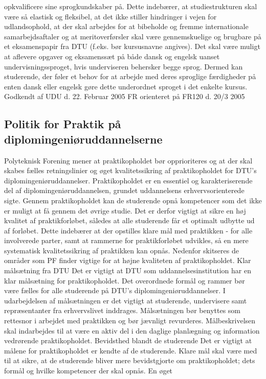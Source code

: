 opkvalificere sine sprogkundskaber på. Dette indebærer, at studiestrukturen skal være så elastisk og fleksibel, at det
ikke stiller hindringer i vejen for udlandsophold, at der skal arbejdes for at bibeholde og fremme internationale
samarbejdsaftaler og at meritoverførsler skal være gennemskuelige og brugbare på et eksamenspapir fra DTU (f.eks.
bør kursusnavne angives).
Det skal være muligt at aflevere opgaver og eksamenssæt på både dansk og engelsk uanset undervisningssproget, hvis
underviseren behersker begge sprog. Dermed kan studerende, der føler et behov for at arbejde med deres sproglige
færdigheder på enten dansk eller engelsk gøre dette underordnet sproget i det enkelte kursus.
Godkendt af UDU d. 22. Februar 2005
FR orienteret på FR120 d. 20/3 2005
\subsection{Politik for Praktik på diplomingeniøruddannelserne}
Polyteknisk Forening mener at praktikopholdet bør opprioriteres og at der skal skabes fælles retningslinier og øget
kvalitetssikring af praktikopholdet for DTU’s diplomingeniøruddannelser.
Praktikopholdet er en essentiel og karakteriserende del af diplomingeniøruddannelsen, grundet uddannelsens
erhvervsorienterede sigte. Gennem praktikopholdet kan de studerende opnå kompetencer som det ikke er muligt at få
gennem det øvrige studie. Det er derfor vigtigt at sikre en høj kvalitet af praktikforløbet, således at alle studerende får et
optimalt udbytte ud af forløbet. Dette indebærer at der opstilles klare mål med praktikken - for alle involverede parter,
samt at rammerne for praktikforløbet udvikles, så en mere systematisk kvalitetssikring af praktikken kan opnås.
Nedenfor skitseres de områder som PF finder vigtige for at højne kvaliteten af praktikopholdet.
Klar målsætning fra DTU
Det er vigtigt at DTU som uddannelsesinstitution har en klar målsætning for praktikopholdet. Det overordnede formål
og rammer bør være fælles for alle studerende på DTU’s diplomingeniøruddannelser. I udarbejdelsen af målsætningen
er det vigtigt at studerende, undervisere samt repræsentanter fra erhvervslivet inddrages. Målsætningen bør benyttes
som rettesnor i arbejdet med praktikken og bør jævnligt revurderes. Målbeskrivelsen skal indarbejdes til at være en
aktiv del i den daglige planlægning og information vedrørende praktikopholdet.
Bevidsthed blandt de studerende
Det er vigtigt at målene for praktikopholdet er kendte af de studerende. Klare mål skal være med til at sikre, at de
studerende bliver mere bevidstgjorte om praktikopholdet; dets formål og hvilke kompetencer der skal opnås. En øget
